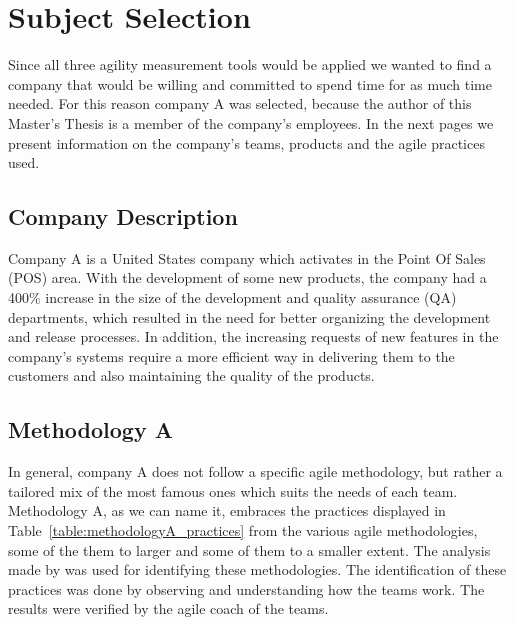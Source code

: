 \section{Subject Selection}
Since all three agility measurement tools would be applied we wanted to find a company that would be willing and committed to spend time for as much time needed. For this reason company A was selected, because the author of this Master's Thesis is a member of the company's employees. In the next pages we present information on the company's teams, products and the agile practices used.

\subsection{Company Description}
Company A is a United States company which activates in the Point Of Sales (POS) area. With the development of some new products, the company had a 400\% increase in the size of the development and quality assurance (QA) departments, which resulted in the need for better organizing the development and release processes. In addition, the increasing requests of new features in the company's systems require a more efficient way in delivering them to the customers and also maintaining the quality of the products.

\subsection{Methodology A}
In general, company A does not follow a specific agile methodology, but rather a tailored mix of the most famous ones which suits the needs of each team. Methodology A, as we can name it, embraces the practices displayed in Table~\ref{table:methodologyA_practices} from the various agile methodologies, some of the them to larger and some of them to a smaller extent. The analysis made by \citet{koch2005agile} was used for identifying these methodologies. The identification of these practices was done by observing and understanding how the teams work. The results were verified by the agile coach of the teams.

